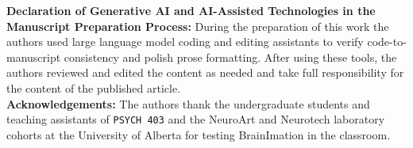 \documentclass[11pt]{article}
\begin{document}
\noindent\textbf{Declaration of Generative AI and AI-Assisted Technologies in the Manuscript Preparation Process:} During the preparation of this work the authors used large language model coding and editing assistants to verify code-to-manuscript consistency and polish prose formatting. After using these tools, the authors reviewed and edited the content as needed and take full responsibility for the content of the published article.\\[2pt]
\noindent\textbf{Acknowledgements:} The authors thank the undergraduate students and teaching assistants of \texttt{PSYCH 403} and the NeuroArt and Neurotech laboratory cohorts at the University of Alberta for testing BrainImation in the classroom.



\end{document}
